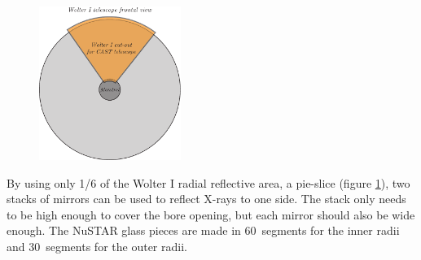 \begin{figure}[htbp]
  \centering
    \includegraphics[height=5cm]{figures/cast/wolter1-cutout.pdf}
  \caption{}
  \label{fig:wolter1-cutout}
\end{figure}

By using only 1/6 of the Wolter I radial reflective area, a pie-slice (figure \ref{fig:wolter1-cutout}), two stacks of mirrors can be used to reflect X-rays to one side. The stack only needs to be high enough to cover the bore opening, but each mirror should also be wide enough. The NuSTAR glass pieces are made in 60\degr\ segments for the inner radii and 30\degr\ segments for the outer radii.

